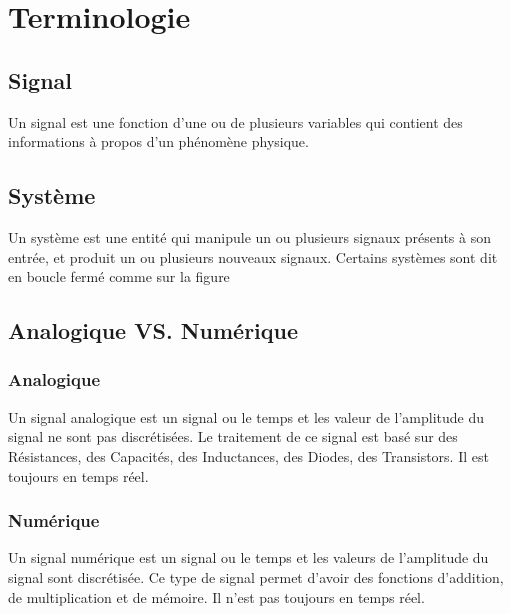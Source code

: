 
\chapter{Terminologie}
\section{Signal}
Un signal est une fonction d'une ou de plusieurs variables qui contient des informations à propos d'un phénomène physique.
\section{Système}
Un système est une entité qui manipule un ou plusieurs signaux présents à son entrée, et produit un ou plusieurs nouveaux signaux. Certains systèmes sont dit en boucle fermé comme sur la figure
\section{Analogique VS. Numérique}
\subsection{Analogique}
Un signal analogique est un signal ou le temps et les valeur de l'amplitude du signal ne sont pas discrétisées. Le traitement de ce signal est basé sur des Résistances, des Capacités, des Inductances, des Diodes, des Transistors. Il est toujours en temps réel.
\subsection{Numérique}
Un signal numérique  est un signal ou le temps et les valeurs de l'amplitude du signal sont discrétisée. Ce type de signal permet d'avoir des fonctions d'addition, de multiplication et de mémoire. Il n'est pas toujours en temps réel.


